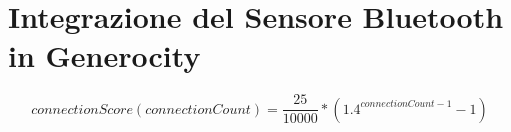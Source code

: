 \chapter{Integrazione del Sensore Bluetooth in Generocity}
\[connectionScore(connectionCount) = \frac{25}{10000} * (1.4^{connectionCount-1} - 1)\]
